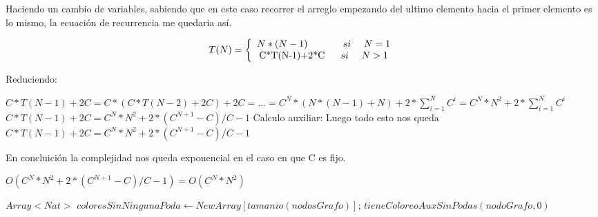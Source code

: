 Haciendo un cambio de variables, sabiendo que en este caso recorrer el arreglo empezando del  ultimo elemento hacia el primer elemento es lo mismo, la ecuación de recurrencia me quedaria así.
  
\begin{equation*}
T(N) = \left\lbrace
\begin{array}{c}
		N*(N-1) \ \ \ \ \ \ \ \ \ \ \ si \ \ \ \   N = 1 \\
		$C*T(N-1)+2*C$  \  \ \ \  \ si \ \ \ \  N>1 \\
\end{array}
\right.
\end{equation*} 

Reduciendo: 
\begin{center}
$C*T(N-1)+2C = C*(C*T(N-2)+2C)+2C= ...= C^N*(N*(N-1)+N)+2*\sum_{i=1}^{N}C^i=C^N*N^2+2*\sum_{i=1}^{N}C^i$ \newline
$C*T(N-1)+2C = C^N*N^2+2*(C^{N+1}-C)/C-1 $
\newline
Calculo auxiliar:  \newline
\newline
Luego todo esto nos queda \newline
$C*T(N-1)+2C = C^N*N^2+2*(C^{N+1}-C)/C-1 $
\end{center}
En concluición la complejidad nos queda exponencial en el caso en que C es fijo. \newline 
\begin{center} 
$O(C^N*N^2+2*(C^{N+1}-C)/C-1)=O(C^N*N^2)$
\end{center}
		
\begin{codebox}
	\li $Array<Nat>$ $coloresSinNingunaPoda \leftarrow NewArray[tamanio(nodosGrafo)]$;  
	\li \Return  $tieneColoreoAuxSinPodas(nodoGrafo,0)$%
\end{codebox}

